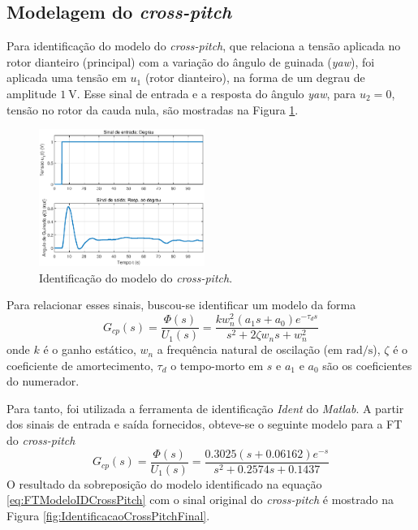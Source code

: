 \subsection{\textbf{Modelagem do \textit{cross-pitch}}}

Para identificação do modelo do \textit{cross-pitch}, que relaciona a tensão aplicada no rotor dianteiro (principal) com a variação do ângulo de guinada (\textit{yaw}), foi aplicada uma tensão em $u_{1}$ (rotor dianteiro), na forma de um degrau de amplitude $\SI{1}{\volt}$. Esse sinal de entrada e a resposta do ângulo \textit{yaw}, para $u_{2} = 0$, tensão no rotor da cauda nula, são mostradas na Figura \ref{fig:IdentificacaoCrossPitchInicial}.

\begin{figure}[H]
    \centering
    \includegraphics[width=0.48\textwidth]{figures/Identificacao/IdentificaCrossPitchInicial.eps}
    \caption{Identificação do modelo do \textit{cross-pitch}.}
    \label{fig:IdentificacaoCrossPitchInicial}
\end{figure}

Para relacionar esses sinais, buscou-se identificar um modelo da forma
\begin{equation}\label{eq:FTCrossPitch}
    G_{cp}(s) = \frac{\Phi(s)}{U_{1}(s)} = \frac{k w_{n}^2 (a_{1} s + a_{0})e^{-\tau_d s}}{s^2 + 2 \zeta w_{n} s + w_{n}^2}
\end{equation}
\noindent onde $k$ é o ganho estático, $w_n$ a frequência natural de oscilação (em $\si{\radian/\s}$), $\zeta$ é o coeficiente de amortecimento, $\tau_d$ o tempo-morto em $\si{s}$ e $a_{1}$ e $a_{0}$ são os coeficientes do numerador.

Para tanto, foi utilizada a ferramenta de identificação \textit{Ident} do \textit{Matlab}. A partir dos sinais de entrada e saída fornecidos, obteve-se o seguinte modelo para a FT do \textit{cross-pitch}
\begin{equation}\label{eq:FTModeloIDCrossPitch}
    G_{cp}(s) = \frac{\Phi(s)}{U_{1}(s)} = \frac{0.3025(s+0.06162)e^{-s}}{s^2 + 0.2574 s + 0.1437}
\end{equation}
O resultado da sobreposição do modelo identificado na equação \eqref{eq:FTModeloIDCrossPitch} com o sinal original do \textit{cross-pitch} é mostrado na Figura \ref{fig:IdentificacaoCrossPitchFinal}.

